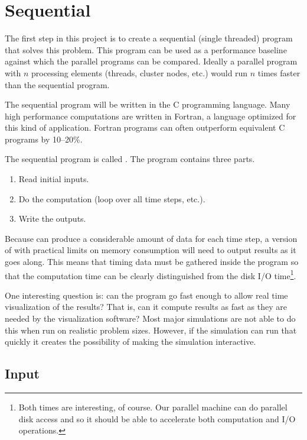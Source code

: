 
\section{Sequential}
\label{sec:sequential}

The first step in this project is to create a sequential (single threaded) program that solves
this problem. This program can be used as a performance baseline against which the parallel
programs can be compared. Ideally a parallel program with $n$ processing elements (threads,
cluster nodes, etc.) would run $n$ times faster than the sequential program.

The sequential program will be written in the C programming language. Many high performance
computations are written in Fortran, a language optimized for this kind of application. Fortran
programs can often outperform equivalent C programs by 10--20\%.

The sequential program is called . The program contains three parts.
\begin{enumerate}
\item Read initial inputs.
\item Do the computation (loop over all time steps, etc.).
\item Write the outputs.
\end{enumerate}

Because  can produce a considerable amount of data for each time step, a
version of  with practical limits on memory consumption will need to output
results as it goes along. This means that timing data must be gathered inside the program so
that the computation time can be clearly distinguished from the disk I/O time\footnote{Both
times are interesting, of course. Our parallel machine can do parallel disk access and so it
should be able to accelerate both computation and I/O operations.}.

One interesting question is: can the program go fast enough to allow real time visualization of
the results? That is, can it compute results as fast as they are needed by the visualization
software? Most major simulations are not able to do this when run on realistic problem sizes.
However, if the simulation can run that quickly it creates the possibility of making the
simulation interactive.

\subsection{Input}
\label{sec:sequential-input}

